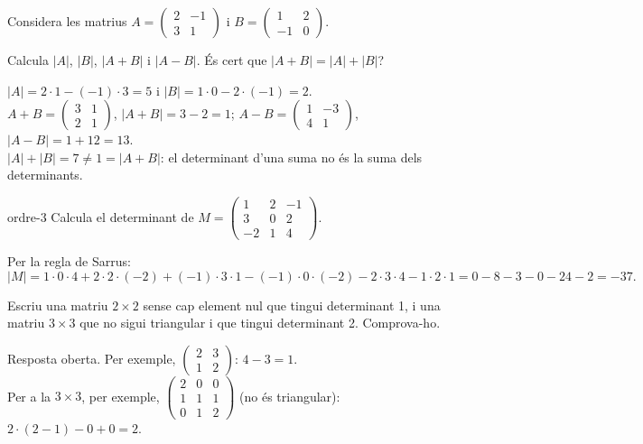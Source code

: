 Considera les matrius $A=\begin{pmatrix}2&-1\\3&1\end{pmatrix}$ i $B=\begin{pmatrix}1&2\\-1&0\end{pmatrix}$.

\begin{apartats}

Calcula $|A|$, $|B|$, $|A+B|$ i $|A-B|$. És cert que $|A+B|=|A|+|B|$?

\begin{solucio}
$|A|=2\cdot1-(-1)\cdot3=5$ i $|B|=1\cdot0-2\cdot(-1)=2$.\\
$A+B=\begin{pmatrix}3&1\\2&1\end{pmatrix}$, $|A+B|=3-2=1$; $A-B=\begin{pmatrix}1&-3\\4&1\end{pmatrix}$,
$|A-B|=1+12=13$.\\
$|A|+|B|=7\ne1=|A+B|$: el determinant d'una suma no és la suma dels determinants.
\end{solucio}

\begin{tria}{ordre-3}
Calcula el determinant de $M=\begin{pmatrix}1&2&-1\\3&0&2\\-2&1&4\end{pmatrix}$.

\begin{solucio}
Per la regla de Sarrus:
\[
|M|=1\cdot0\cdot4+2\cdot2\cdot(-2)+(-1)\cdot3\cdot1-(-1)\cdot0\cdot(-2)-2\cdot3\cdot4-1\cdot2\cdot1
=0-8-3-0-24-2=-37.
\]
\end{solucio}

Escriu una matriu $2\times2$ sense cap element nul que tingui determinant 1, i una matriu $3\times3$ que
no sigui triangular i que tingui determinant 2. Comprova-ho.

\begin{solucio}
Resposta oberta. Per exemple, $\begin{pmatrix}2&3\\1&2\end{pmatrix}$: $4-3=1$.\\
Per a la $3\times3$, per exemple, $\begin{pmatrix}2&0&0\\1&1&1\\0&1&2\end{pmatrix}$ (no és triangular):
$2\cdot(2-1)-0+0=2$.
\end{solucio}
\end{tria}


\end{apartats}
